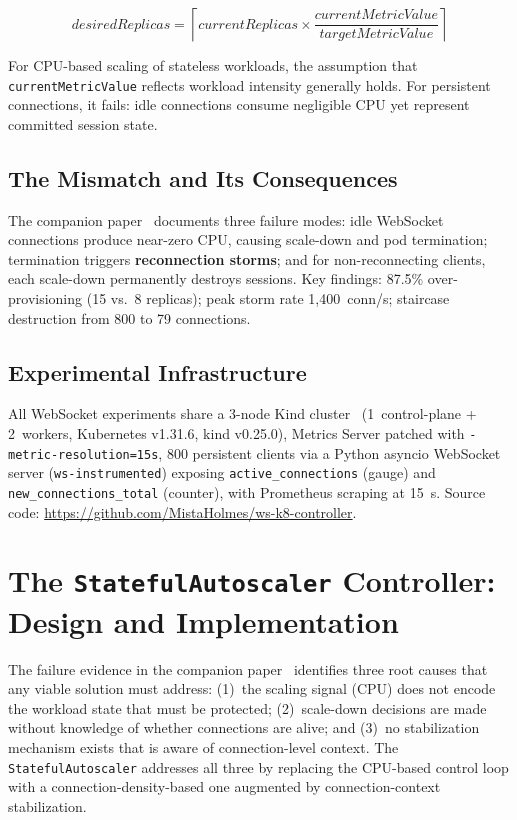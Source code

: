 \documentclass[3p,twocolumn]{elsarticle}
\theoremstyle{plain}%
\theoremstyle{definition}%
\begin{document}
\begin{equation}
\textit{desiredReplicas} = \left\lceil \textit{currentReplicas} \times
  \frac{\textit{currentMetricValue}}{\textit{targetMetricValue}} \right\rceil
\label{eq:hpa}
\end{equation}

For CPU-based scaling of stateless workloads, the assumption that \texttt{currentMetricValue} reflects workload intensity generally holds. For persistent connections, it fails: idle connections consume negligible CPU yet represent committed session state.

\subsection{The Mismatch and Its Consequences}

The companion paper~\cite{behera2026hpa} documents three failure modes: idle WebSocket connections produce near-zero CPU, causing scale-down and pod termination; termination triggers \textbf{reconnection storms}; and for non-reconnecting clients, each scale-down permanently destroys sessions. Key findings: 87.5\% over-provisioning (15 vs.\ 8 replicas); peak storm rate 1,400~conn/s; staircase destruction from 800 to 79 connections.

\subsection{Experimental Infrastructure}

All WebSocket experiments share a 3-node Kind cluster~\cite{kind_docs} (1~control-plane + 2~workers, Kubernetes v1.31.6, kind v0.25.0), Metrics Server patched with \texttt{-metric-resolution=15s}, 800 persistent clients via a Python asyncio WebSocket server (\texttt{ws-instrumented}) exposing \texttt{active\_connections} (gauge) and \texttt{new\_connections\_total} (counter), with Prometheus scraping at 15~s. Source code: \url{https://github.com/MistaHolmes/ws-k8-controller}.



\section{The \texttt{StatefulAutoscaler} Controller: Design and Implementation}
\label{sec:controller}

The failure evidence in the companion paper~\cite{behera2026hpa} identifies three root causes
that any viable solution must address: (1)~the scaling signal (CPU) does not encode the
workload state that must be protected; (2)~scale-down decisions are made without knowledge
of whether connections are alive; and (3)~no stabilization mechanism exists that is aware of
connection-level context. The \texttt{StatefulAutoscaler} addresses all three by replacing the
CPU-based control loop with a connection-density-based one augmented by
connection-context stabilization.
\end{document}
